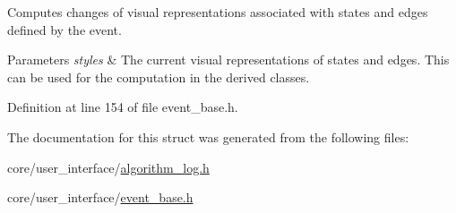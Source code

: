 Computes changes of visual representations associated with states and edges defined by the event. 


\begin{DoxyParams}{Parameters}
{\em styles} & The current visual representations of states and edges. This can be used for the computation in the derived classes. \\
\hline
\end{DoxyParams}


Definition at line 154 of file event\+\_\+base.\+h.



The documentation for this struct was generated from the following files\+:\begin{DoxyCompactItemize}
\item 
core/user\+\_\+interface/\hyperlink{algorithm__log_8h}{algorithm\+\_\+log.\+h}\item 
core/user\+\_\+interface/\hyperlink{event__base_8h}{event\+\_\+base.\+h}\end{DoxyCompactItemize}

